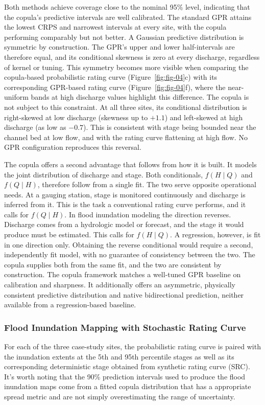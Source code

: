 \documentclass[11pt]{article}
\begin{document}
Both methods achieve coverage close to the nominal 95\% level, indicating that the copula's predictive intervals are well calibrated. The standard GPR attains the lowest CRPS and narrowest intervals at every site, with the copula performing comparably but not better. A Gaussian predictive distribution is symmetric by construction. The GPR's upper and lower half-intervals are therefore equal, and its conditional skewness is zero at every discharge, regardless of kernel or tuning. This symmetry becomes more visible when comparing the copula-based probabilistic rating curve (Figure~\ref{fig:fig-04}c) with its corresponding GPR-based rating curve (Figure~\ref{fig:fig-04}f), where the near-uniform bands at high discharge values highlight this difference. The copula is not subject to this constraint. At all three sites, its conditional distribution is right-skewed at low discharge (skewness up to $+1.1$) and left-skewed at high discharge (as low as $-0.7$). This is consistent with stage being bounded near the channel bed at low flow, and with the rating curve flattening at high flow. No GPR configuration reproduces this reversal.

The copula offers a second advantage that follows from how it is built. It models the joint distribution of discharge and stage. Both conditionals, $f(H \mid Q)$ and $f(Q \mid H)$, therefore follow from a single fit. The two serve opposite operational needs. At a gauging station, stage is monitored continuously and discharge is inferred from it. This is the task a conventional rating curve performs, and it calls for $f(Q \mid H)$. In flood inundation modeling the direction reverses.  Discharge comes from a hydrologic model or forecast, and the stage it would produce must be estimated. This calls for $f(H \mid Q)$. A regression, however, is fit in one direction only. Obtaining the reverse conditional would require a second, independently fit model, with no guarantee of consistency between the two. The copula supplies both from the same fit, and the two are consistent by construction. The copula framework matches a well-tuned GPR baseline on calibration and sharpness. It additionally offers an asymmetric, physically consistent predictive distribution and native bidirectional prediction, neither available from a regression-based baseline.

\subsubsection{Flood Inundation Mapping with Stochastic Rating Curve}
For each of the three case-study sites, the probabilistic rating curve is paired with the inundation extents at the 5th and 95th percentile stages as well as its corresponding deterministic stage obtained from synthetic rating curve (SRC). It's worth noting that the 90\% prediction intervals used to produce the flood inundation maps come from a fitted copula distribution that has a appropriate spread metric and are not simply overestimating the range of uncertainty.
\end{document}
